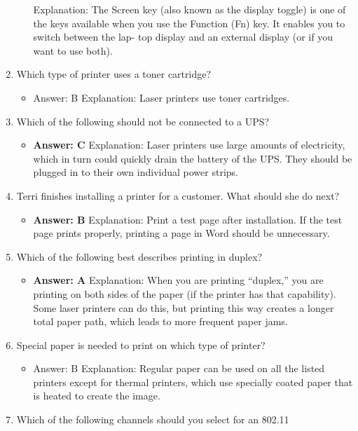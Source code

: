 \documentclass{article}
\begin{document}
\begin{enumerate}
\begin{itemize}
Explanation: The Screen key (also known as the display toggle) is one of the keys
available when you use the Function (Fn) key. It enables you to switch between the lap-
top display and an external display (or if you want to use both).
    \end{itemize}
    \item Which type of printer uses a toner cartridge?
    \begin{itemize}
        \item Answer: B
Explanation: Laser printers use toner cartridges.
    \end{itemize}
    \item Which of the following should not be connected to a UPS?
    \begin{itemize}
        \item \textbf{Answer: C}
Explanation: Laser printers use large amounts of electricity, which in turn could
quickly drain the battery of the UPS. They should be plugged in to their own individual
power strips.
    \end{itemize}
    \item Terri finishes installing a printer for a customer. What should she
do next?
    \begin{itemize}
        \item \textbf{Answer: B}
Explanation: Print a test page after installation. If the test page prints properly, printing
a page in Word should be unnecessary.
    \end{itemize}
    \item Which of the following best describes printing in duplex?
    \begin{itemize}
        \item \textbf{Answer: A}
Explanation: When you are printing “duplex,” you are printing on both sides of the
paper (if the printer has that capability). Some laser printers can do this, but printing
this way creates a longer total paper path, which leads to more frequent paper jams.
    \end{itemize}
    \item Special paper is needed to print on which type of printer?
    \begin{itemize}
        \item Answer: B
Explanation: Regular paper can be used on all the listed printers except for thermal
printers, which use specially coated paper that is heated to create the image.
    \end{itemize}
    \item Which of the following channels should you select for an 802.11

\end{enumerate}
\end{document}
